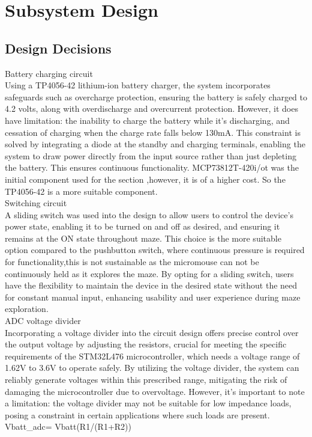 \documentclass[class=report,11pt,crop=false]{standalone}
\begin{document}
\chapter{Subsystem Design} \label{ch:design}
\vspace{-1cm}
\section{Design Decisions}
\tabitem Battery charging circuit\\

Using a TP4056-42 lithium-ion battery charger, the system incorporates safeguards such as overcharge protection, ensuring the battery is safely charged to 4.2 volts, along with overdischarge and overcurrent protection. However, it does have limitation: the inability to charge the battery while it's discharging, and cessation of charging when the charge rate falls below 130mA. This constraint is solved by integrating a diode at the standby and charging terminals, enabling the system to draw power directly from the input source rather than just depleting the battery. This ensures continuous functionality. MCP73812T-420i/ot was the initial component used for the section ,however, it is of a higher cost. So the TP4056-42 is a more suitable component.\\

\tabitem Switching circuit\\


A sliding switch was used into the design to allow users to control the device's power state, enabling it to be turned on and off as desired, and ensuring it remains at the ON state throughout maze. This choice is the more suitable option compared to the pushbutton switch, where continuous pressure is required for functionality,this is not sustainable as the micromouse can not be continuously held as it explores the maze. By opting for a sliding switch, users have the flexibility to maintain the device in the desired state without the need for constant manual input, enhancing usability and user experience during maze exploration.\\


\tabitem ADC voltage divider\\

Incorporating a voltage divider into the circuit design offers precise control over the output voltage by adjusting the resistors, crucial for meeting the specific requirements of the STM32L476 microcontroller, which needs a voltage range of 1.62V to 3.6V to operate safely. By utilizing the voltage divider, the system can reliably generate voltages within this prescribed range, mitigating the risk of damaging the microcontroller due to overvoltage. However, it's important to note a limitation: the voltage divider may not be suitable for low impedance loads, posing a constraint in certain applications where such loads are present.
Vbatt_adc= Vbatt(R1/(R1+R2))
\end{document}
